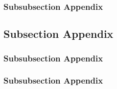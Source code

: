 \lipsum[1]

\subsubsection{Subsubsection Appendix}

\lipsum[1]

\subsection{Subsection Appendix}

\lipsum[1-2]

\subsubsection{Subsubsection Appendix}

\lipsum[1]

\subsubsection{Subsubsection Appendix}

\lipsum[1]

